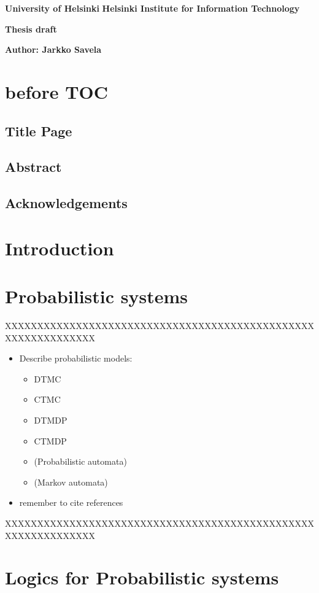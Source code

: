 \documentclass[12pt,a4paper]{article}
\begin{document}
\noindent
\textbf{University of Helsinki} \newline
\textbf{Helsinki Institute for Information Technology}

\noindent
\textbf{Thesis draft}

\noindent
\textbf{Author: Jarkko Savela}

\section*{before TOC}
\subsection*{Title Page}
\subsection*{Abstract}
\subsection*{Acknowledgements}

\newpage
\tableofcontents


\section{Introduction}

\section{Probabilistic systems}
XXXXXXXXXXXXXXXXXXXXXXXXXXXXXXXXXXXXXXXXXXXXXXXXXXXXXXXXXXXXXX

\begin{itemize}
\item Describe probabilistic models:
\begin{itemize}
\item DTMC
\item CTMC
\item DTMDP
\item CTMDP
\item (Probabilistic automata)
\item (Markov automata)
\end{itemize}
\item remember to cite references
\end{itemize}

XXXXXXXXXXXXXXXXXXXXXXXXXXXXXXXXXXXXXXXXXXXXXXXXXXXXXXXXXXXXXX


\section{Logics for Probabilistic systems}
\end{document}
